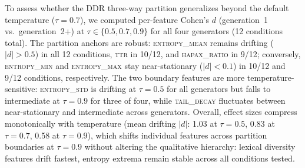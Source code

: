 
To assess whether the DDR three-way partition generalizes beyond the default temperature ($\tau{=}0.7$), we computed per-feature Cohen's $d$ (generation~1 vs.\ generation~2+) at $\tau \in \{0.5, 0.7, 0.9\}$ for all four generators (12 conditions total).
The partition anchors are robust: \textsc{entropy\_mean} remains drifting ($|d|>0.5$) in all 12 conditions, \textsc{ttr} in 10/12, and \textsc{hapax\_ratio} in 9/12; conversely, \textsc{entropy\_min} and \textsc{entropy\_max} stay near-stationary ($|d|<0.1$) in 10/12 and 9/12 conditions, respectively.
The two boundary features are more temperature-sensitive: \textsc{entropy\_std} is drifting at $\tau{=}0.5$ for all generators but falls to intermediate at $\tau{=}0.9$ for three of four, while \textsc{tail\_decay} fluctuates between near-stationary and intermediate across generators.
Overall, effect sizes compress monotonically with temperature (mean drifting $|d|$: 1.03 at $\tau{=}0.5$, 0.83 at $\tau{=}0.7$, 0.58 at $\tau{=}0.9$), which shifts individual features across partition boundaries at $\tau{=}0.9$ without altering the qualitative hierarchy: lexical diversity features drift fastest, entropy extrema remain stable across all conditions tested.
